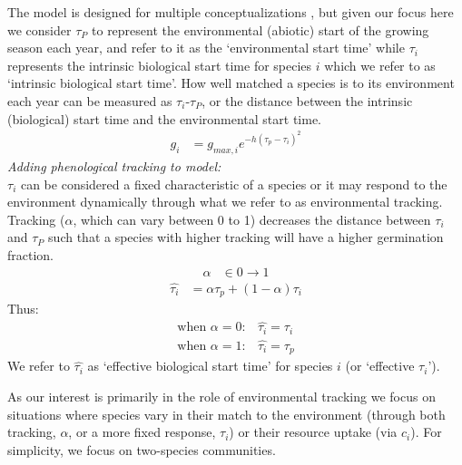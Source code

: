 \documentclass[11pt,letterpaper]{article}
\begin{document}
The model is designed for multiple conceptualizations \citep{Chesson:2004eo}, but given our focus here we consider $\tau_P$ to represent the environmental (abiotic) start of the growing season each year, and refer to it as the `environmental start time' while $\tau_i$ represents the intrinsic biological start time for species $i$ which we refer to as `intrinsic biological start time'. How well matched a species is to its environment each year can be measured as $\tau_i$-$\tau_P$, or the distance between the intrinsic (biological) start time and the environmental start time.
\begin{align}
g_{i} & = g_{max,i}e^{-h(\tau_{p}-\tau_{i})^2} 
\end{align}
\noindent \emph{Adding phenological tracking to model:}\\
$\tau_i$ can be considered a fixed characteristic of a species or it may respond to the environment dynamically through what we refer to as environmental tracking. Tracking ($\alpha$, which can vary between 0 to 1) decreases the distance between $\tau_i$ and $\tau_P$ such that a species with higher tracking  will have a higher germination fraction.
\begin{align*}
\alpha & \in 0 \rightarrow 1  
\end{align*}
\begin{align}
\hat{\tau_{i}} & = \alpha \tau_{p} + (1-\alpha)\tau_{i}
\end{align}
\noindent Thus:
\begin{align*}
\text{when } \alpha = 0: & \hat{\tau_{i}}=\tau_{i}\\
\text{when }  \alpha = 1: & \hat{\tau_{i}}=\tau_{p}
\end{align*}
We refer to $\hat{\tau_{i}}$ as `effective biological start time' for species $i$ (or `effective $\tau_i$'). 

As our interest is primarily in the role of environmental tracking we focus on situations where species vary in their match to the environment (through both tracking, $\alpha$, or a more fixed response, $\tau_i$) or their resource uptake (via $c_i$). For simplicity, we focus on two-species communities.
\end{document}
